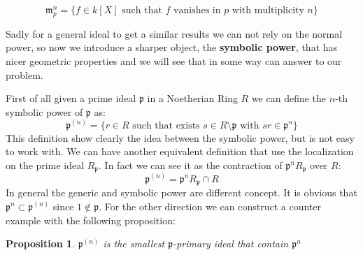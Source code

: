 \documentclass[a4wide]{book}
\theoremstyle{plain}
\newtheorem{prop}[teo]{Proposition}
\theoremstyle{remark}
\theoremstyle{definition}
\newcommand{\p}{\mathfrak{p}}
\newcommand{\mm}{\mathfrak{m}}
\newcounter{que}
\begin{document}
	\begin{equation}\label{eq:max_pow}
		\mm_p^n = \{ f \in k[X] \text{ such that } f \text{ vanishes in } p \text{ with multiplicity } n\}
	\end{equation}
	
	Sadly for a general ideal to get a similar results we can not rely on the normal power, so now we introduce a sharper object, the \textbf{symbolic power}, that has nicer geometric properties and we will see that in some way can answer to our problem. %
	
%	
%		
	First of all given a prime ideal $ \p $ in a Noetherian Ring $ R $ we can define the $ n $-th symbolic power of $ \p $ as:
	\begin{equation}\label{eq:sym_pow_p1}
		\p^{(n)} = \{ r \in R \text{ such that exists } s \in R \setminus \p \text{ with } sr \in \p^n \}
	\end{equation}
	This definition show clearly the idea between the symbolic power, but is not easy to work with. We can have another equivalent definition that use the localization on the prime ideal $ R_\p $. In fact we can see it as the contraction of $ \p^n R_\p $ over $ R $:
	\begin{equation}\label{eq:sym_pow_p2}
		\p^{(n)} = \p^n R_\p \cap R
	\end{equation}
	In general the generic and symbolic power are different concept. It is obvious that $ \p^{n} \subset \p^{(n)} $ since $ 1 \not \in \p $. For the other direction we can construct a counter example with the following proposition:
	\begin{prop}\label{prop:sym_is_primary}
		$ \p^{(n)} $ is the smallest $ \p $-primary ideal that contain $ \p^n $
	\end{prop}
\end{document}
